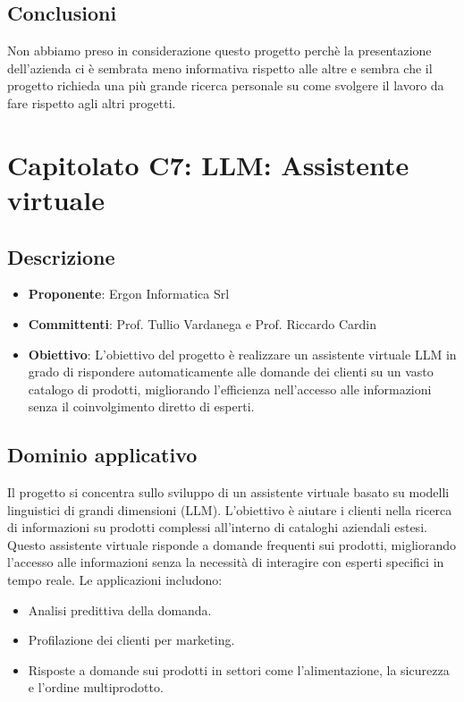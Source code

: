 \documentclass[italian, 12pt]{article}
\begin{document}
\subsection{Conclusioni}
Non abbiamo preso in considerazione questo progetto perchè la presentazione dell’azienda ci è sembrata meno informativa rispetto alle altre e sembra che il progetto richieda una più grande ricerca personale su come svolgere il lavoro da fare rispetto agli altri progetti.

\section{Capitolato C7: LLM: Assistente virtuale}
\subsection{Descrizione}
\begin{itemize}
\item\textbf{Proponente}: Ergon Informatica Srl
\item\textbf{Committenti}: Prof. Tullio Vardanega e Prof. Riccardo Cardin
\item\textbf{Obiettivo}: L'obiettivo del progetto è realizzare un assistente virtuale LLM in grado di rispondere automaticamente alle domande dei clienti su un vasto catalogo di prodotti, migliorando l'efficienza nell'accesso alle informazioni senza il coinvolgimento diretto di esperti.
\end{itemize}

\subsection{Dominio applicativo}
Il progetto si concentra sullo sviluppo di un assistente virtuale basato su modelli linguistici di grandi dimensioni (LLM). L'obiettivo è aiutare i clienti nella ricerca di informazioni su prodotti complessi all'interno di cataloghi aziendali estesi. Questo assistente virtuale risponde a domande frequenti sui prodotti, migliorando l'accesso alle informazioni senza la necessità di interagire con esperti specifici in tempo reale. Le applicazioni includono:
\begin{itemize}
\item Analisi predittiva della domanda.
\item Profilazione dei clienti per marketing.
\item Risposte a domande sui prodotti in settori come l'alimentazione, la sicurezza e l'ordine multiprodotto.
\end{itemize}
\end{document}
